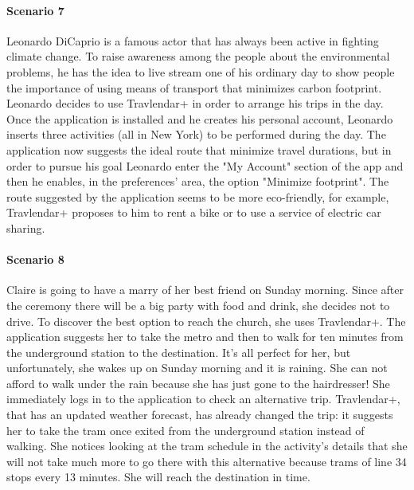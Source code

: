 \documentclass[12pt,titlepage]{article}
\begin{document}
\paragraph{Scenario 7}
Leonardo DiCaprio is a famous actor that has always been active in fighting climate change. To raise awareness among the people about the environmental problems, he has the idea to live stream one of his ordinary day to show people the importance of using means of transport that minimizes carbon footprint. 
Leonardo decides to use Travlendar+ in order to arrange his trips in the day. Once the application is installed and he creates his personal account, Leonardo inserts three activities (all in New York) to be performed during the day. The application now suggests the ideal route that minimize travel durations, but in order to pursue his goal Leonardo enter the "My Account" section of the app and then he enables, in the preferences' area, the option "Minimize footprint". The route suggested by the application seems to be more eco-friendly, for example, Travlendar+ proposes to him to rent a bike or to use a service of electric car sharing.

\paragraph{Scenario 8}
Claire is going to have a marry of her best friend on Sunday morning. Since after the ceremony there will be a big party with food and drink, she decides not to drive. To discover the best option to reach the church, she uses Travlendar+. The application suggests her to take the metro and then to walk for ten minutes from the underground station to the destination. It's all perfect for her, but unfortunately, she wakes up on Sunday morning and it is raining. She can not afford to walk under the rain because she has just gone to the hairdresser! She immediately logs in to the application to check an alternative trip. Travlendar+, that has an updated weather forecast, has already changed the trip: it suggests her to take the tram once exited from the underground station instead of walking. She notices looking at the tram schedule in the activity's details that she will not take much more to go there with this alternative because trams of line 34 stops every 13 minutes. She will reach the destination in time.
\end{document}
